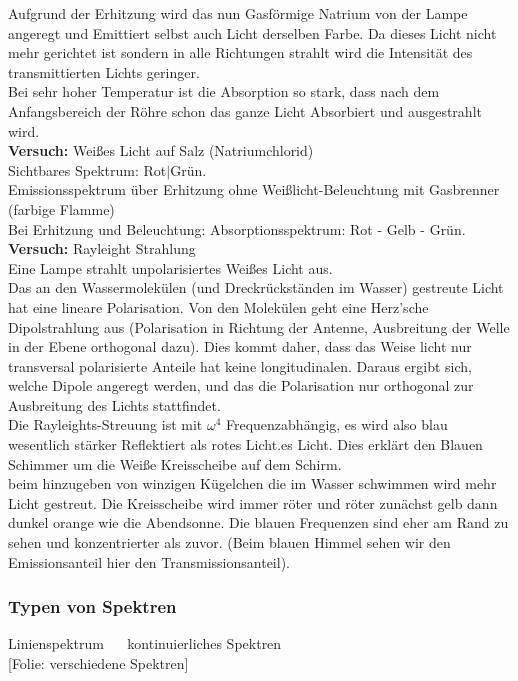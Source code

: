 \documentclass[titlepage,11pt,a4paper,ngerman]{report}
\newcommand{\folie}[1]{\color{gray}[Folie: #1]\color{black}}
\newcommand{\versuch}[1]{\color{red!50!black} \textbf{Versuch:} \color{black} #1\\ }
\begin{document}
Aufgrund der Erhitzung wird das nun Gasförmige Natrium von der Lampe angeregt und Emittiert selbst auch Licht derselben Farbe. Da dieses Licht nicht mehr gerichtet ist sondern in alle Richtungen strahlt wird die Intensität des transmittierten Lichts geringer.\\
Bei sehr hoher Temperatur ist die Absorption so stark, dass nach dem Anfangsbereich der Röhre schon das ganze Licht Absorbiert und ausgestrahlt wird.\\[5pt]
\versuch{Weißes Licht auf Salz (Natriumchlorid)}
Sichtbares Spektrum: Rot$ | $Grün.\\
Emissionsspektrum über Erhitzung ohne Weißlicht-Beleuchtung mit Gasbrenner (farbige Flamme)\\
Bei Erhitzung und Beleuchtung: Absorptionsspektrum: Rot - Gelb - Grün.\\[5pt]
\versuch{Rayleight Strahlung}
Eine Lampe strahlt unpolarisiertes Weißes Licht aus.\\
Das an den Wassermolekülen (und Dreckrückständen im Wasser) gestreute Licht hat eine lineare Polarisation. Von den Molekülen geht eine Herz'sche Dipolstrahlung aus (Polarisation in Richtung der Antenne, Ausbreitung der Welle in der Ebene orthogonal dazu). Dies kommt daher, dass das Weise licht nur transversal polarisierte Anteile hat keine longitudinalen. Daraus ergibt sich, welche Dipole angeregt werden, und das die Polarisation nur orthogonal zur Ausbreitung des Lichts stattfindet.\\
Die Rayleights-Streuung ist mit $ \omega^4 $ Frequenzabhängig, es wird also blau wesentlich stärker Reflektiert als rotes Licht.es Licht. Dies erklärt den Blauen Schimmer um die Weiße Kreisscheibe auf dem Schirm.\\
beim hinzugeben von winzigen Kügelchen die im Wasser schwimmen wird mehr Licht gestreut. Die Kreisscheibe wird immer röter und röter zunächst gelb dann dunkel orange wie die Abendsonne. Die blauen Frequenzen sind eher am Rand zu sehen und konzentrierter als zuvor. (Beim blauen Himmel sehen wir den Emissionsanteil hier den Transmissionsanteil).\\[5pt]

\subsubsection{Typen von Spektren}

Linienspektrum $ \quad $ kontinuierliches Spektren\\
\folie{verschiedene Spektren}
\end{document}
